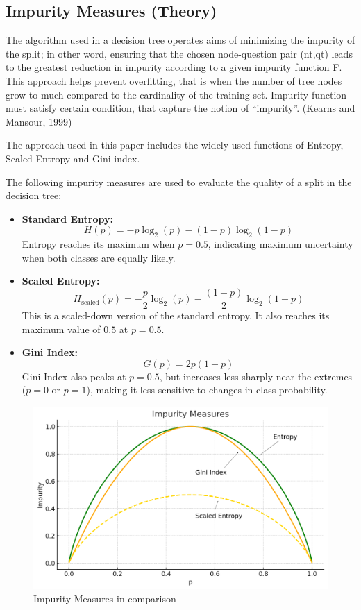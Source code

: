 \documentclass{article}
\begin{document}
\subsection{Impurity Measures (Theory)}

The algorithm used in a decision tree operates aims of minimizing the impurity of the split; in other word, ensuring that the chosen node-question pair (nt,qt) leads to the greatest reduction in impurity according to a given impurity function F. This approach helps prevent overfitting, that is when the number of tree nodes grow to much compared to the cardinality of the training set.
Impurity function must satisfy certain condition, that capture the notion of “impurity”. (Kearns and Mansour, 1999)

The approach used in this paper includes the widely used functions of Entropy, Scaled Entropy and Gini-index.

The following impurity measures are used to evaluate the quality of a split in the decision tree:

\begin{itemize}
    \item \textbf{Standard Entropy:}
    \[
        H(p) = -p \log_2(p) - (1 - p) \log_2(1 - p)
    \]
    Entropy reaches its maximum when $p = 0.5$, indicating maximum uncertainty when both classes are equally likely.

    \item \textbf{Scaled Entropy:}
    \[
        H_{\text{scaled}}(p) = -\frac{p}{2} \log_2(p) - \frac{(1 - p)}{2} \log_2(1 - p)
    \]
    This is a scaled-down version of the standard entropy. It also reaches its maximum value of $0.5$ at $p = 0.5$.

    \item \textbf{Gini Index:}
    \[
        G(p) = 2p(1 - p)
    \]
    Gini Index also peaks at $p = 0.5$, but increases less sharply near the extremes ($p = 0$ or $p = 1$), making it less sensitive to changes in class probability.
\end{itemize}


\begin{figure}[H]
\centering
\includegraphics[width=0.5\linewidth]{E-SC-GI.png}
\caption{\label{fig:frog}Impurity Measures in comparison}
\end{figure}
\end{document}
